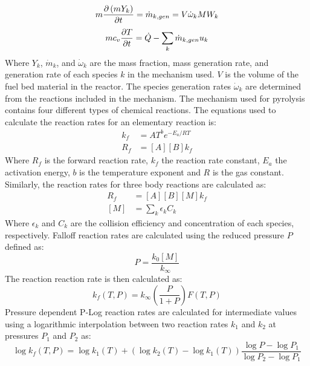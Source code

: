         \begin{equation}
            m \pder[\left( m Y_k \right)]{t} = \dot{m}_{k, gen} = V \dot{\omega}_k MW_k
            \label{eqn:speciesMass}
        \end{equation}
        \begin{equation}
            mc_{v} \pder[T]{t} = \dot{Q} - \sum_{k} \dot{m}_{k,gen}u_k
        \end{equation}
    Where $Y_k$, $\dot{m}_{k}$, and  $\dot{\omega}_k$ are the mass fraction, mass generation rate, and generation rate of each species $k$ in the mechanism used. $V$ is the volume of the fuel bed material in the reactor. The species generation rates $ \dot{\omega}_k$ are determined from the reactions included in the mechanism. The mechanism used for pyrolysis contains four different types of chemical reactions. The equations used to calculate the reaction rates for an elementary reaction is:
        \begin{align}
            k_f &= AT^{b}e^{-E_a/RT}\\
            R_{f} &= [A][B]k_f 
        \end{align}
    Where $R_f$ is the forward reaction rate, $k_f$ the reaction rate constant, $E_a$ the activation energy, $b$ is the temperature exponent and $R$ is the gas constant. Similarly, the reaction rates for three body reactions are calculated as:
        \begin{align}
            R_f &= [A][B][M]k_f \\
            [M] &= \sum_{k}\epsilon_k C_k
        \end{align}
    Where $\epsilon_k$ and $C_k$ are the collision efficiency and concentration of each species, respectively. Falloff reaction rates are calculated using the reduced pressure $P$ defined as:
        \begin{equation}
            P = \frac{k_0[M]}{k_\infty}
        \end{equation}
    The reaction reaction rate is then calculated as:
        \begin{equation}
            k_f (T, P) = k_{\infty} \left( \frac{P}{1+P}\right) F(T,P)
        \end{equation}
      Pressure dependent P-Log reaction rates are calculated for intermediate values using a logarithmic interpolation between two reaction rates $k_1$ and $k_2$ at pressures $P_1$ and $P_2$ as:
        \begin{equation}
            \log k_f(T,P) = \log k_1(T) + (\log k_2(T) - \log k_1(T))\frac{\log P - \log P_1}{\log P_2 - \log P_1}
        \end{equation}
